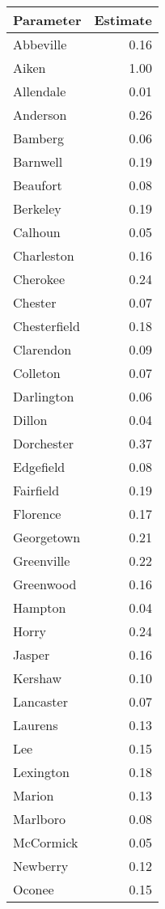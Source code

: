 \begin{tabular}{lr}
\toprule
   Parameter &  Estimate \\
\midrule
   Abbeville &      0.16 \\
       Aiken &      1.00 \\
   Allendale &      0.01 \\
    Anderson &      0.26 \\
     Bamberg &      0.06 \\
    Barnwell &      0.19 \\
    Beaufort &      0.08 \\
    Berkeley &      0.19 \\
     Calhoun &      0.05 \\
  Charleston &      0.16 \\
    Cherokee &      0.24 \\
     Chester &      0.07 \\
Chesterfield &      0.18 \\
   Clarendon &      0.09 \\
    Colleton &      0.07 \\
  Darlington &      0.06 \\
      Dillon &      0.04 \\
  Dorchester &      0.37 \\
   Edgefield &      0.08 \\
   Fairfield &      0.19 \\
    Florence &      0.17 \\
  Georgetown &      0.21 \\
  Greenville &      0.22 \\
   Greenwood &      0.16 \\
     Hampton &      0.04 \\
       Horry &      0.24 \\
      Jasper &      0.16 \\
     Kershaw &      0.10 \\
   Lancaster &      0.07 \\
     Laurens &      0.13 \\
         Lee &      0.15 \\
   Lexington &      0.18 \\
      Marion &      0.13 \\
    Marlboro &      0.08 \\
   McCormick &      0.05 \\
    Newberry &      0.12 \\
      Oconee &      0.15 \\

\end{tabular}
